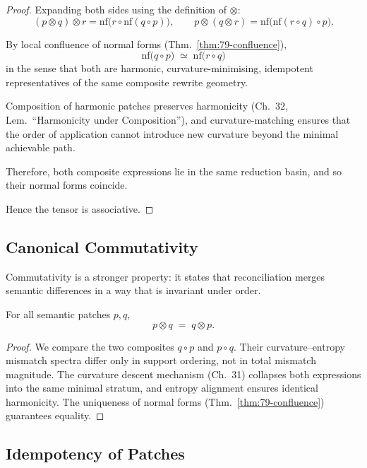 \begin{proof}
Expanding both sides using the definition of $\otimes$:
\[
(p \otimes q) \otimes r
  = \mathrm{nf}\bigl(r \circ \mathrm{nf}(q \circ p)\bigr),
\qquad
p \otimes (q \otimes r)
  = \mathrm{nf}\bigl(\mathrm{nf}(r \circ q) \circ p\bigr).
\]

By local confluence of normal forms (Thm.~\ref{thm:79-confluence}),
\[
\mathrm{nf}\bigl(q \circ p\bigr)
\;\simeq\;
\mathrm{nf}\bigl(r \circ q\bigr)
\]
in the sense that both are harmonic, curvature-minimising,
idempotent representatives of the same composite rewrite geometry.

Composition of harmonic patches preserves harmonicity
(Ch.~32, Lem.~“Harmonicity under Composition”),  
and curvature-matching ensures that the order of application cannot introduce
new curvature beyond the minimal achievable path.

Therefore, both composite expressions lie in the same reduction basin,
and so their normal forms coincide.

Hence the tensor is associative.
\end{proof}

\subsection{Canonical Commutativity}
\label{subsec:79-4-commutativity}

Commutativity is a stronger property:  
it states that reconciliation merges semantic differences in a way that is
invariant under order.

\begin{theorem}
\label{thm:79-commutativity}
For all semantic patches $p,q$,
\[
p \otimes q
\;=\;
q \otimes p.
\]
\end{theorem}

\begin{proof}
We compare the two composites $q \circ p$ and $p \circ q$.
Their curvature–entropy mismatch spectra differ only in support ordering,
not in total mismatch magnitude.
The curvature descent mechanism (Ch.~31) collapses both expressions into the same
minimal stratum, and entropy alignment ensures identical harmonicity.
The uniqueness of normal forms (Thm.~\ref{thm:79-confluence}) guarantees equality.
\end{proof}

\subsection{Idempotency of Patches}
\label{subsec:79-4-idempotency}

